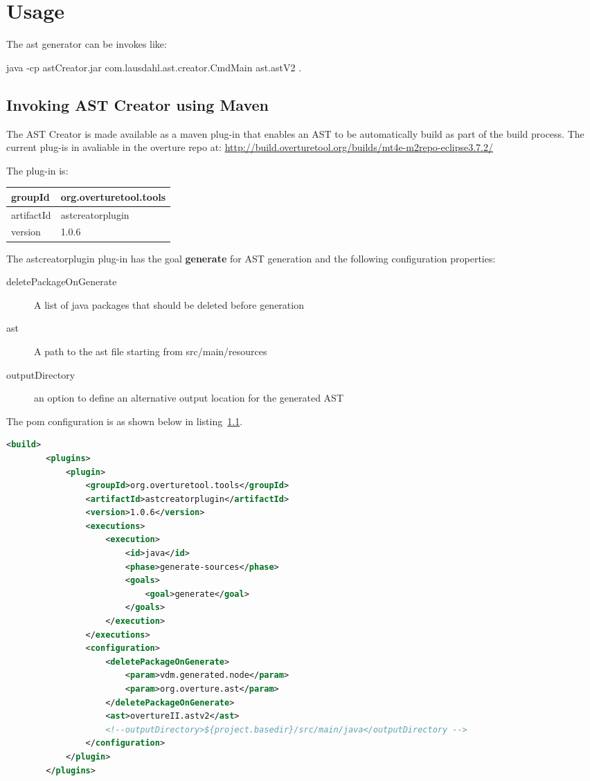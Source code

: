 \documentclass{overturerepchap}
\begin{document}
\section{Usage}
The ast generator can be invokes like: 

\begin{astlst}
java -cp astCreator.jar com.lausdahl.ast.creator.CmdMain ast.astV2 .
\end{astlst}

\subsection{Invoking AST Creator using Maven}

The AST Creator is made available as a maven plug-in that enables an AST to be automatically build as part of the build process. The current plug-is in avaliable in the overture repo at: \url{http://build.overturetool.org/builds/mt4e-m2repo-eclipse3.7.2/}

The plug-in is:

\begin{tabular}{ |l|l| }\hline
  groupId & org.overturetool.tools\\\hline
artifactId &astcreatorplugin\\\hline
version & 1.0.6\\\hline
\end{tabular}

The astcreatorplugin plug-in has the goal \textbf{generate} for AST generation and the following configuration properties:

\begin{description}
\item[deletePackageOnGenerate] A list of java packages that should be deleted before generation
\item[ast] A path to the ast file starting from src/main/resources
\item[outputDirectory] an option to define an alternative output location for the generated AST
\end{description}

The pom configuration is as shown below in listing~\ref{}.

\begin{lstlisting}[language=XML,tabsize=2,basicstyle=\ttfamily\footnotesize]
<build>
		<plugins>
			<plugin>
				<groupId>org.overturetool.tools</groupId>
				<artifactId>astcreatorplugin</artifactId>
				<version>1.0.6</version>
				<executions>
					<execution>
						<id>java</id>
						<phase>generate-sources</phase>
						<goals>
							<goal>generate</goal>
						</goals>
					</execution>
				</executions>
				<configuration>
					<deletePackageOnGenerate>
						<param>vdm.generated.node</param>
						<param>org.overture.ast</param>
					</deletePackageOnGenerate>
					<ast>overtureII.astv2</ast>
					<!--outputDirectory>${project.basedir}/src/main/java</outputDirectory -->
				</configuration>
			</plugin>
		</plugins>
\end{lstlisting}
\end{document}
